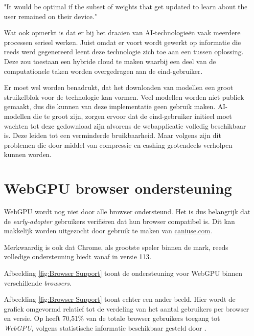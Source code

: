 \begin{displayquote}
    "It would be optimal if the subset of weights that get updated to learn about the user remained on their device."
\end{displayquote}

Wat \textcite{Fleetwood2022} ook opmerkt is dat er bij het draaien van  AI-technologieën vaak meerdere processen serieel werken. Juist omdat er voort wordt gewerkt op informatie die reeds werd gegenereerd leent deze technologie zich toe aan een tussen oplossing. Deze zou toestaan een hybride cloud te maken waarbij een deel van de computationele taken worden overgedragen aan de eind-gebruiker.

\bigbreak{}

Er moet wel worden benadrukt, dat het downloaden van modellen een groot struikelblok voor de technologie kan vormen. Veel modellen worden niet publiek gemaakt, dus die kunnen van deze implementatie geen gebruik maken. AI-modellen die te groot zijn, zorgen ervoor dat de eind-gebruiker initieel moet wachten tot deze gedownload zijn alvorens de webapplicatie volledig beschikbaar is. Deze leiden tot een verminderde bruikbaarheid. Maar volgens \textcite{Fleetwood2022} zijn dit problemen die door middel van compressie en cashing grotendeels verholpen kunnen worden.

\break{}

\section{WebGPU browser ondersteuning}

WebGPU wordt nog niet door alle browser ondersteund. Het is dus belangrijk dat de \textit{early-adopter} gebruikers verifiëren dat hun browser compatibel is. Dit kan makkelijk worden uitgezocht door gebruik te maken van \href{https://caniuse.com/webgpu}{caniuse.com}.

\bigbreak{}

Merkwaardig is ook dat Chrome, als grootste speler binnen de mark, reeds volledige ondersteuning biedt vanaf in versie 113. \autocite{Deveria2024}

\bigbreak{}

Afbeelding \ref{fig:Browser Support} toont de ondersteuning voor WebGPU binnen verschillende \textit{browsers}.

\bigbreak{}
\date{}

Afbeelding \ref{fig:Browser Support} toont echter een ander beeld. Hier wordt de grafiek omgevormd relatief tot de verdeling van het aantal gebruikers per browser en versie. Op   heeft 70,51\% van de totale browser gebruikers toegang tot \textit{WebGPU}, volgens statistische informatie beschikbaar gesteld door \textcite{Deveria2024}.

